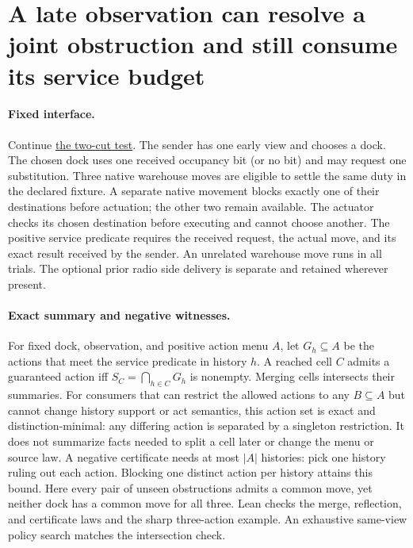 \documentclass{article}
\begin{document}
\section*{A late observation can resolve a joint obstruction and still consume its service budget}
\paragraph{Fixed interface.}
Continue \href{https://github.com/eternal-november/eos-research-programmes/pull/823}{the two-cut test}.
The sender has one early view and chooses a dock. The chosen dock
uses one received occupancy bit (or no bit) and may request one
substitution. Three native warehouse moves are eligible to settle
the same duty in the declared fixture. A separate native movement
blocks exactly one of their destinations before actuation; the
other two remain available. The actuator checks its chosen
destination before executing and cannot choose another. The
positive service predicate requires the received request, the
actual move, and its exact result received by the sender. An
unrelated warehouse move runs in all trials. The optional prior
radio side delivery is separate and retained wherever present.

\paragraph{Exact summary and negative witnesses.}
For fixed dock, observation, and positive action menu $A$, let
$G_h\subseteq A$ be the actions that meet the service predicate
in history $h$. A reached cell $C$ admits a guaranteed action iff
$S_C=\bigcap_{h\in C}G_h$ is nonempty. Merging cells intersects
their summaries. For consumers that can restrict the allowed
actions to any $B\subseteq A$ but cannot change history support
or act semantics, this action set is exact and distinction-minimal:
any differing action is separated by a singleton restriction.
It does not summarize facts needed to split a cell later or change
the menu or source law. A negative certificate needs at most
$|A|$ histories: pick one history ruling out each action.
Blocking one distinct action per history attains this bound.
Here every pair of unseen obstructions admits a common move,
yet neither dock has a common move for all three. Lean checks
the merge, reflection, and certificate laws and the sharp
three-action example. An exhaustive same-view policy search
matches the intersection check.
\end{document}
